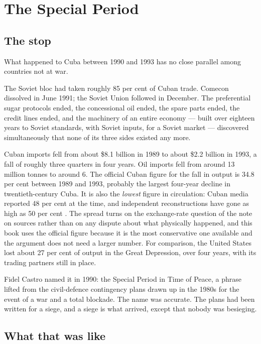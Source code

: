 \chapter{The Special Period}
\label{ch:collapse}

\section{The stop}

What happened to Cuba between 1990 and 1993 has no close parallel among
countries not at war.

The Soviet bloc had taken roughly 85 per cent of Cuban trade. Comecon dissolved
in June 1991; the Soviet Union followed in December. The preferential sugar
protocols ended, the concessional oil ended, the spare parts ended, the credit
lines ended, and the machinery of an entire economy --- built over eighteen
years to Soviet standards, with Soviet inputs, for a Soviet market ---
discovered simultaneously that none of its three sides existed any more.

Cuban imports fell from about \$8.1 billion in 1989 to about \$2.2 billion in
1993, a fall of roughly three quarters in four years.\unv{} Oil imports fell
from around 13 million tonnes to around 6.\unv{} The official Cuban figure for the fall
in output is 34.8 per cent between 1989 and 1993, probably the largest
four-year decline in twentieth-century Cuba. It is also the \emph{lowest}
figure in circulation: Cuban media reported 48 per cent at the time, and
independent reconstructions have gone as high as 50 per cent
\citep{mesalago2005}. The spread turns
on the exchange-rate question of the note on sources rather than on any dispute
about what physically happened, and this book uses the official figure because
it is the most conservative one available and the argument does not need a
larger number. For comparison, the United States lost about 27 per cent of
output in the Great Depression, over four years, with its trading partners
still in place.

Fidel Castro named it in 1990: the Special Period in Time of Peace, a phrase
lifted from the civil-defence contingency plans drawn up in the 1980s for the
event of a war and a total blockade. The name was accurate. The plans had been
written for a siege, and a siege is what arrived, except that nobody was
besieging.

\section{What that was like}

